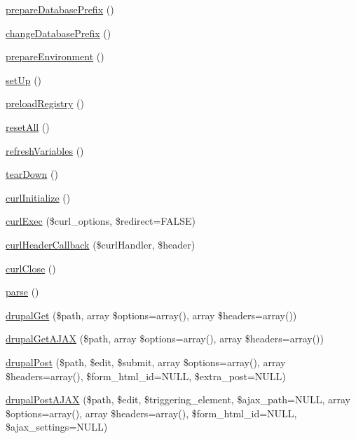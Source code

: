 \begin{DoxyCompactItemize}
\item 
\hyperlink{classDrupalWebTestCase_ab0d1446330ac8178c8baefcd5cfa677c}{prepareDatabasePrefix} ()
\item 
\hyperlink{classDrupalWebTestCase_aaf79c7de4222e244e8b6b6228ba1278f}{changeDatabasePrefix} ()
\item 
\hyperlink{classDrupalWebTestCase_aafa7fa69ee28fd661c23edbc4f6766ac}{prepareEnvironment} ()
\item 
\hyperlink{classDrupalWebTestCase_a110ecf5deb57ee6a908617360c1f6ec4}{setUp} ()
\item 
\hyperlink{classDrupalWebTestCase_a72ead1d18fb2bd5e890c8a153e368fc8}{preloadRegistry} ()
\item 
\hyperlink{classDrupalWebTestCase_a2e4892b3ad344e16afa73847432190fa}{resetAll} ()
\item 
\hyperlink{classDrupalWebTestCase_ad82b8c5cdc60fb19c9550ab7ba3fd017}{refreshVariables} ()
\item 
\hyperlink{classDrupalWebTestCase_a6c0dba3c89c4aab3fa2576857c6f2be1}{tearDown} ()
\item 
\hyperlink{classDrupalWebTestCase_a8c51d47f5b89aad9f5e7fc4fa001bf05}{curlInitialize} ()
\item 
\hyperlink{classDrupalWebTestCase_a8e9057a571cc788067f42a1a03ae21dc}{curlExec} (\$curl\_\-options, \$redirect=FALSE)
\item 
\hyperlink{classDrupalWebTestCase_a7993c14e1d81d759a6b3903764bb0e46}{curlHeaderCallback} (\$curlHandler, \$header)
\item 
\hyperlink{classDrupalWebTestCase_a0b3eb01ee1312ea28f78fc1a293835be}{curlClose} ()
\item 
\hyperlink{classDrupalWebTestCase_a19289cdf27c85cad8e10960769d1e28b}{parse} ()
\item 
\hyperlink{classDrupalWebTestCase_ae282e9e10195fb8dad8a49d1b35e31c9}{drupalGet} (\$path, array \$options=array(), array \$headers=array())
\item 
\hyperlink{classDrupalWebTestCase_a8ff95f6c8aa06587a6e73c8ae4bdfbe0}{drupalGetAJAX} (\$path, array \$options=array(), array \$headers=array())
\item 
\hyperlink{classDrupalWebTestCase_acbc229f81258bb985a1f011a4a5a99a3}{drupalPost} (\$path, \$edit, \$submit, array \$options=array(), array \$headers=array(), \$form\_\-html\_\-id=NULL, \$extra\_\-post=NULL)
\item 
\hyperlink{classDrupalWebTestCase_a20ccc6595e0280dbff604c4f536ed6df}{drupalPostAJAX} (\$path, \$edit, \$triggering\_\-element, \$ajax\_\-path=NULL, array \$options=array(), array \$headers=array(), \$form\_\-html\_\-id=NULL, \$ajax\_\-settings=NULL)

\end{DoxyCompactItemize}
